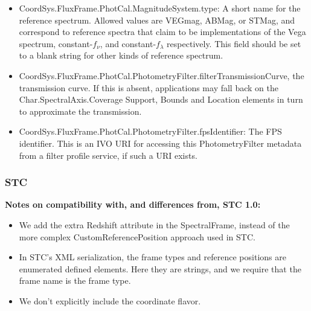 \documentclass[11pt]{article}
\begin{document}
{\begin{itemize}
\item  CoordSys.FluxFrame.PhotCal.MagnitudeSystem.type: A short name for the reference spectrum.
Allowed values are VEGmag, ABMag, or STMag, and correspond to reference spectra
that claim to be implementations of the Vega spectrum, constant-$f_\nu$, and constant-$f_\lambda$ 
respectively. This field should be set to a blank string for other kinds of reference spectrum.

\item CoordSys.FluxFrame.PhotCal.PhotometryFilter.filterTransmissionCurve, the transmission curve. If this is absent, 
applications may fall back on the 
Char.SpectralAxis.Coverage Support, Bounds and Location elements in turn to approximate the transmission.

\item  CoordSys.FluxFrame.PhotCal.PhotometryFilter.fpsIdentifier:  The FPS identifier.
This is an IVO URI for accessing this PhotometryFilter metadata from a filter profile service, if such a URI exists.



\end{itemize}

}

\subsubsection{STC}
 
 {\bf Notes on compatibility with, and differences from, STC 1.0:  } 
\begin{itemize}
\item We add the extra Redshift attribute in the SpectralFrame, instead of the
more complex CustomReferencePosition approach used in STC.
\item In STC's XML serialization, the frame types and reference positions are enumerated
defined elements. Here they are strings, and we require that the frame name is the frame type.
\item We don't explicitly include the coordinate flavor.
\end{itemize}
\end{document}
